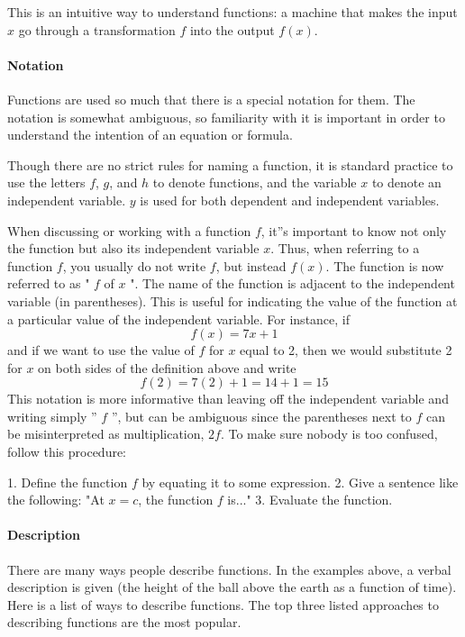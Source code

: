 This is an intuitive way to understand functions: a machine that makes the input $x$ go through a transformation $f$ into the output $f(x)$.


\paragraph{Notation}

Functions are used so much that there is a special notation for them. The notation is somewhat ambiguous, so familiarity with it is important in order to understand the intention of an equation or formula.

Though there are no strict rules for naming a function, it is standard practice to use the letters $f$, $g$, and $h$ to denote functions, and the variable $x$ to denote an independent variable. $y$ is used for both dependent and independent variables.

When discussing or working with a function $f$, it''s important to know not only the function but also its independent variable $x$. Thus, when referring to a function $f$, you usually do not write $f$, but instead $f(x)$. The function is now referred to as " $f$ of $x$ ". The name of the function is adjacent to the independent variable (in parentheses). This is useful for indicating the value of the function at a particular value of the independent variable. For instance, if 
$$
f(x) = 7x + 1
$$
and if we want to use the value of $f$ for $x$ equal to 2, then we would substitute 2 for $x$ on both sides of the definition above and write
$$
f(2) = 7(2) + 1 = 14 + 1 = 15
$$
This notation is more informative than leaving off the independent variable and writing simply '' $f$ '', but can be ambiguous since the parentheses next to $f$ can be misinterpreted as multiplication, $2f$. To make sure nobody is too confused, follow this procedure:

1. Define the function $f$ by equating it to some expression.
2. Give a sentence like the following: "At $x = c$, the function $f$ is..."
3. Evaluate the function.

\paragraph{Description}

There are many ways people describe functions. In the examples above, a verbal description is given (the height of the ball above the earth as a function of time). Here is a list of ways to describe functions. The top three listed approaches to describing functions are the most popular.

